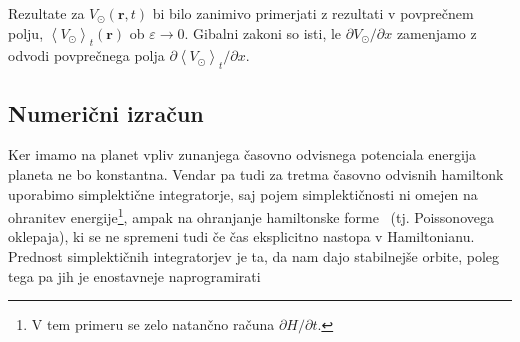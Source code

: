 \documentclass[12pt, a4paper]{article}
\renewcommand{\r}{
    \ensuremath{\mathbf{r}}
}
\newcommand{\avgt}[1]{
	\ensuremath{\left\langle #1 \right\rangle_t}
}
\begin{document}
Rezultate za $V_\odot(\r,t)$ bi bilo zanimivo primerjati z rezultati v povpre\v cnem polju, $\avgt{V_\odot}(\r)$ ob
$\varepsilon \to 0$. Gibalni zakoni so isti, le $\partial V_\odot/\partial x$ zamenjamo z odvodi povpre\v cnega polja
$\partial \avgt{V_\odot}/\partial x$.

\subsection{Numeri\v cni izra\v cun}
Ker imamo na planet vpliv zunanjega \v casovno odvisnega potenciala energija planeta ne bo konstantna. Vendar pa
tudi za tretma \v casovno odvisnih hamiltonk uporabimo simplekti\v cne integratorje, saj pojem simplekti\v cnosti
ni omejen na ohranitev energije\footnote{V tem primeru se zelo natan\v cno ra\v cuna $\partial H/\partial t$.}, ampak
na ohranjanje hamiltonske forme~\cite{sirca} (tj. Poissonovega oklepaja), ki se ne spremeni tudi \v ce \v cas
eksplicitno nastopa v Hamiltonianu. Prednost simplekti\v cnih integratorjev je ta, da nam dajo stabilnej\v se
orbite, poleg tega pa jih je enostavneje naprogramirati
\end{document}

